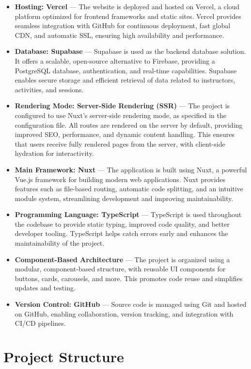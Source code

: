 \begin{itemize}
    \item \textbf{Hosting: Vercel} --- The website is deployed and hosted on Vercel, a cloud platform optimized for frontend frameworks and static sites. Vercel provides seamless integration with GitHub for continuous deployment, fast global CDN, and automatic SSL, ensuring high availability and performance.
    \item \textbf{Database: Supabase} --- Supabase is used as the backend database solution. It offers a scalable, open-source alternative to Firebase, providing a PostgreSQL database, authentication, and real-time capabilities. Supabase enables secure storage and efficient retrieval of data related to instructors, activities, and sessions.
    \item \textbf{Rendering Mode: Server-Side Rendering (SSR)} --- The project is configured to use Nuxt's server-side rendering mode, as specified in the configuration file. All routes are rendered on the server by default, providing improved SEO, performance, and dynamic content handling. This ensures that users receive fully rendered pages from the server, with client-side hydration for interactivity.
    \item \textbf{Main Framework: Nuxt} --- The application is built using Nuxt, a powerful Vue.js framework for building modern web applications. Nuxt provides features such as file-based routing, automatic code splitting, and an intuitive module system, streamlining development and improving maintainability.
    \item \textbf{Programming Language: TypeScript} --- TypeScript is used throughout the codebase to provide static typing, improved code quality, and better developer tooling. TypeScript helps catch errors early and enhances the maintainability of the project.
    \item \textbf{Component-Based Architecture} --- The project is organized using a modular, component-based structure, with reusable UI components for buttons, cards, carousels, and more. This promotes code reuse and simplifies updates and testing.
    \item \textbf{Version Control: GitHub} --- Source code is managed using Git and hosted on GitHub, enabling collaboration, version tracking, and integration with CI/CD pipelines.
\end{itemize}

\newpage
\section{Project Structure}
